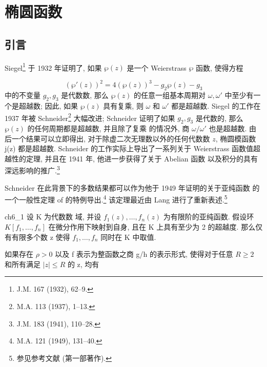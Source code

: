 
\chapter{椭圆函数}\label{ch:6}

\section{引言}

Siegel\footnote{J.M. 167 (1932), 62--9.} 于 1932 年证明了, 如果 $\wp(z)$ 是一个 Weierstrass $\wp$ 函数, 使得方程

\[(\wp'(z))^2 = 4(\wp(z))^3 - g_2\wp(z) - g_3\]
中的不变量 $g_2, g_3$ 是代数数, 那么 $\wp(z)$ 的任意一组基本周期对 $\omega, \omega'$ 中至少有一个是超越数; 因此, 如果 $\wp(z)$ 具有复乘, 则 $\omega$ 和 $\omega'$ 都是超越数. Siegel 的工作在 1937 年被 Schneider\footnote{M.A. 113 (1937), 1--13.} 大幅改进; Schneider 证明了如果 $g_2, g_3$ 是代数的, 那么 $\wp(z)$ 的任何周期都是超越数, 并且除了复乘 的情况外, 商 $\omega/\omega'$ 也是超越数. 由后一个结果可以立即得出, 对于除虚二次无理数以外的任何代数数 $z$, 椭圆模函数 j(z) 都是超越数. Schneider 的工作实际上导出了一系列关于 Weierstrass 函数值超越性的定理, 并且在 1941 年, 他进一步获得了关于 Abelian 函数 以及积分的具有深远影响的推广.\footnote{J.M. 183 (1941), 110--28.}

Schneider 在此背景下的多数结果都可以作为他于 1949 年证明的关于亚纯函数 的一个一般性定理 of 的特例导出.\footnote{M.A. 121 (1949), 131--40.} 该定理最近由 Lang 进行了重新表述.\footnote{参见参考文献 (第一部著作).}

\begin{mythm}{}{ch6_1}
设 K 为代数数 域, 并设 $f_1(z), \ldots, f_n(z)$ 为有限阶的亚纯函数. 假设环 $K[f_1, \ldots, f_n]$ 在微分作用下映射到自身, 且在 K 上具有至少为 2 的超越度. 那么仅有有限多个数 z 使得 $f_1, \ldots, f_n$ 同时在 K 中取值.
\end{mythm}

如果存在 $\rho > 0$ 以及 f 表示为整函数之商 g/h 的表示形式, 使得对于任意 $R \ge 2$ 和所有满足 $|z| \le R$ 的 z, 均有

